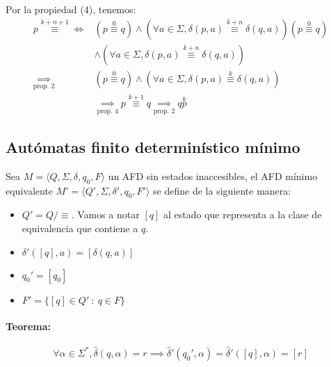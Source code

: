 \begin{enumerate}
\begin{demo}[0.8\textwidth]
\begin{itemize}
              Por la propiedad (4), tenemos:
              \begin{align*}
                p\overset{k+n+1}{\equiv} \iff       & \left(p \overset{0}{\equiv}q\right)\land\left(
                \forall a\in\Sigma, \delta(p,a) \overset{k+n}{\equiv} \delta(q,a)
                \right)   \left(p \overset{0}{\equiv}q\right)                                                                                                           \\ &\land\left(
                \forall a\in\Sigma, \delta(p,a) \overset{k+n}{\equiv} \delta(q,a)
                \right)                                                                                                                                                 \\
                \underset{\text{prop. 2}}{\implies} & \left(p \overset{0}{\equiv}q\right)\land\left(
                \forall a\in\Sigma, \delta(p,a) \overset{k}{\equiv} \delta(q,a) \right)                                                                                 \\
                                                    & \underset{\text{prop. 4}}{\implies} p \overset{k+1}{\equiv}q \underset{\text{prop. 2}}{\implies} q \overset{k}{p}
              \end{align*}
          \end{itemize}
        \end{demo}
\end{enumerate}
\subsection{Autómatas finito determinístico mínimo}
Sea \(M=\langle Q, \Sigma, \delta, q_0, F\rangle\) un AFD sin estados inaccesibles, el AFD mínimo equivalente \(M'= \langle Q', \Sigma, \delta', q_0, F'\rangle\) se define de la siguiente manera:
\begin{itemize}
  \item \(Q' = Q / \equiv\). Vamos a notar \([q]\) al estado que representa a la clase de equivalencia que contiene a \(q\).
  \item \(\delta'([q], a) = [\delta(q,a)]\)
  \item \(q_0' = [q_0]\)
  \item \(F' = \{[q]\in Q'~:~ q \in F\}\)
\end{itemize}

\paragraph{Teorema:}
\[\forall \alpha\in\Sigma^*, \hat\delta(q, \alpha) = r \implies \hat\delta'(q_0', \alpha) = \hat\delta'([q], \alpha) = [r]\]

